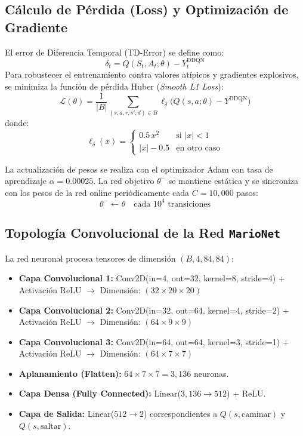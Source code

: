 \documentclass[11pt,letterpaper]{article}
\begin{document}
\subsection{Cálculo de Pérdida (Loss) y Optimización de Gradiente}
El error de Diferencia Temporal (TD-Error) se define como:
\begin{equation}
    \delta_t = Q(S_t, A_t; \theta) - Y_t^{\text{DDQN}}
\end{equation}
Para robustecer el entrenamiento contra valores atípicos y gradientes explosivos, se minimiza la función de pérdida Huber (\textit{Smooth L1 Loss}):
\begin{equation}
    \mathcal{L}(\theta) = \frac{1}{|B|} \sum_{(s, a, r, s', d) \in B} \ell_{\delta}\big(Q(s, a; \theta) - Y^{\text{DDQN}}\big)
\end{equation}
donde:
\begin{equation}
    \ell_{\delta}(x) = 
    \begin{cases}
        0.5 \, x^2 & \text{si } |x| < 1 \\
        |x| - 0.5 & \text{en otro caso}
    \end{cases}
\end{equation}

La actualización de pesos se realiza con el optimizador Adam con tasa de aprendizaje $\alpha = 0.00025$. La red objetivo $\theta^-$ se mantiene estática y se sincroniza con los pesos de la red online periódicamente cada $C = 10,000$ pasos:
\begin{equation}
    \theta^- \leftarrow \theta \quad \text{cada } 10^4 \text{ transiciones}
\end{equation}

\subsection{Topología Convolucional de la Red \texttt{MarioNet}}
La red neuronal procesa tensores de dimensión $(B, 4, 84, 84)$:
\begin{itemize}
    \item \textbf{Capa Convolucional 1:} Conv2D(in=4, out=32, kernel=8, stride=4) + Activación ReLU $\rightarrow$ Dimensión: $(32 \times 20 \times 20)$
    \item \textbf{Capa Convolucional 2:} Conv2D(in=32, out=64, kernel=4, stride=2) + Activación ReLU $\rightarrow$ Dimensión: $(64 \times 9 \times 9)$
    \item \textbf{Capa Convolucional 3:} Conv2D(in=64, out=64, kernel=3, stride=1) + Activación ReLU $\rightarrow$ Dimensión: $(64 \times 7 \times 7)$
    \item \textbf{Aplanamiento (Flatten):} $64 \times 7 \times 7 = 3,136$ neuronas.
    \item \textbf{Capa Densa (Fully Connected):} Linear($3,136 \rightarrow 512$) + ReLU.
    \item \textbf{Capa de Salida:} Linear($512 \rightarrow 2$) correspondientes a $Q(s, \text{caminar})$ y $Q(s, \text{saltar})$.
\end{itemize}
\end{document}
